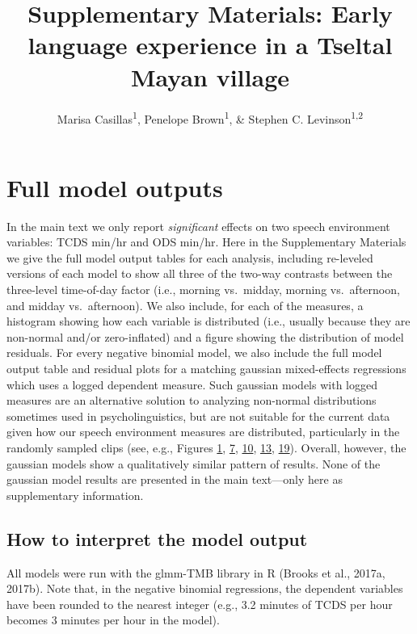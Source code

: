 \documentclass[floatsintext,man]{apa6}
\title{Supplementary Materials: Early language experience in a Tseltal Mayan
village}
\author{Marisa Casillas\textsuperscript{1}, Penelope Brown\textsuperscript{1}, \& Stephen C. Levinson\textsuperscript{1,2}}
\affiliation{
    \vspace{0.5cm}
          \textsuperscript{1} Max Planck Institute for Psycholinguistics\\
          \textsuperscript{2} Department of Biological Anthropology, Cambridge University  }
\theoremstyle{definition}
\theoremstyle{definition}
\theoremstyle{definition}
\theoremstyle{remark}
\begin{document}
\maketitle

\setcounter{secnumdepth}{0}



\section{Full model outputs}\label{models}

In the main text we only report \emph{significant} effects on two speech
environment variables: TCDS min/hr and ODS min/hr. Here in the
Supplementary Materials we give the full model output tables for each
analysis, including re-leveled versions of each model to show all three
of the two-way contrasts between the three-level time-of-day factor
(i.e., morning vs.~midday, morning vs.~afternoon, and midday
vs.~afternoon). We also include, for each of the measures, a histogram
showing how each variable is distributed (i.e., usually because they are
non-normal and/or zero-inflated) and a figure showing the distribution
of model residuals. For every negative binomial model, we also include
the full model output table and residual plots for a matching gaussian
mixed-effects regressions which uses a logged dependent measure. Such
gaussian models with logged measures are an alternative solution to
analyzing non-normal distributions sometimes used in psycholinguistics,
but are not suitable for the current data given how our speech
environment measures are distributed, particularly in the randomly
sampled clips (see, e.g., Figures \protect\hyperlink{fig1}{1},
\protect\hyperlink{fig7}{7}, \protect\hyperlink{fig10}{10},
\protect\hyperlink{fig13}{13}, \protect\hyperlink{fig19}{19}). Overall,
however, the gaussian models show a qualitatively similar pattern of
results. None of the gaussian model results are presented in the main
text---only here as supplementary information.

\subsection{How to interpret the model
output}\label{how-to-interpret-the-model-output}

All models were run with the glmm-TMB library in R (Brooks et al.,
2017a, 2017b). Note that, in the negative binomial regressions, the
dependent variables have been rounded to the nearest integer (e.g., 3.2
minutes of TCDS per hour becomes 3 minutes per hour in the model).
\end{document}
